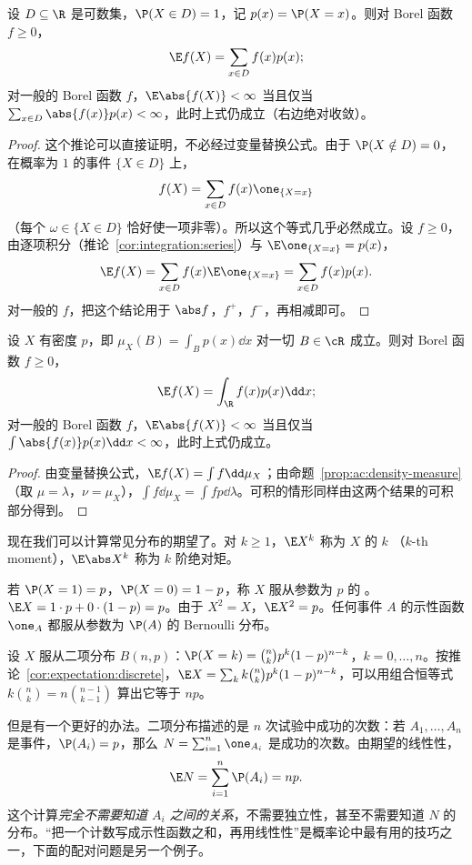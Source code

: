 \begin{corollary}[离散型随机变量]\label{cor:expectation:discrete}
设 $D\subseteq\R$ 是可数集，$\P(X\in D)=1$，记 $p(x)=\P(X=x)$。则对 Borel 函数 $f\geqslant0$，
\[
\E f(X)=\sum_{x\in D}f(x)p(x);
\]
对一般的 Borel 函数 $f$，$\E\abs{f(X)}<\infty$ 当且仅当 $\sum_{x\in D}\abs{f(x)}p(x)<\infty$，此时上式仍成立（右边绝对收敛）。
\end{corollary}
\begin{proof}
这个推论可以直接证明，不必经过变量替换公式。由于 $\P(X\notin D)=0$，在概率为 $1$ 的事件 $\{X\in D\}$ 上，
\[
f(X)=\sum_{x\in D}f(x)\one_{\{X=x\}}
\]
（每个 $\omega\in\{X\in D\}$ 恰好使一项非零）。所以这个等式几乎必然成立。设 $f\geqslant0$，由逐项积分（推论~\ref{cor:integration:series}）与 $\E\one_{\{X=x\}}=p(x)$，
\[
\E f(X)=\sum_{x\in D}f(x)\E\one_{\{X=x\}}=\sum_{x\in D}f(x)p(x).
\]
对一般的 $f$，把这个结论用于 $\abs f$，$f^+$，$f^-$，再相减即可。
\end{proof}

\begin{corollary}[有密度的随机变量]\label{cor:expectation:density}
设 $X$ 有密度 $p$，即 $\mu_X(B)=\int_Bp(x)\dd x$ 对一切 $B\in\cR$ 成立。则对 Borel 函数 $f\geqslant0$，
\[
\E f(X)=\int_\R f(x)p(x)\dd x;
\]
对一般的 Borel 函数 $f$，$\E\abs{f(X)}<\infty$ 当且仅当 $\int\abs{f(x)}p(x)\dd x<\infty$，此时上式仍成立。
\end{corollary}
\begin{proof}
由变量替换公式，$\E f(X)=\int f\dd\mu_X$；由命题~\ref{prop:ac:density-measure}（取 $\mu=\lambda$，$\nu=\mu_X$），$\int f\dd\mu_X=\int fp\dd\lambda$。可积的情形同样由这两个结果的可积部分得到。
\end{proof}

现在我们可以计算常见分布的期望了。对 $k\geqslant1$，$\E X^k$ 称为 $X$ 的 $k$ （$k$-th moment），$\E\abs X^k$ 称为 $k$ 阶绝对矩。

\begin{example}\label{ex:expectation:bernoulli}
若 $\P(X=1)=p$，$\P(X=0)=1-p$，称 $X$ 服从参数为 $p$ 的 。$\E X=1\cdot p+0\cdot(1-p)=p$。由于 $X^2=X$，$\E X^2=p$。任何事件 $A$ 的示性函数 $\one_A$ 都服从参数为 $\P(A)$ 的 Bernoulli 分布。
\end{example}

\begin{example}\label{ex:expectation:binomial}
设 $X$ 服从二项分布 $B(n,p)$：$\P(X=k)=\binom nkp^k(1-p)^{n-k}$，$k=0,\dots,n$。按推论~\ref{cor:expectation:discrete}，$\E X=\sum_kk\binom nkp^k(1-p)^{n-k}$，可以用组合恒等式 $k\binom nk=n\binom{n-1}{k-1}$ 算出它等于 $np$。

但是有一个更好的办法。二项分布描述的是 $n$ 次试验中成功的次数：若 $A_1,\dots,A_n$ 是事件，$\P(A_i)=p$，那么 $N=\sum_{i=1}^n\one_{A_i}$ 是成功的次数。由期望的线性性，
\[
\E N=\sum_{i=1}^n\P(A_i)=np .
\]
这个计算\emph{完全不需要知道 $A_i$ 之间的关系}，不需要独立性，甚至不需要知道 $N$ 的分布。“把一个计数写成示性函数之和，再用线性性”是概率论中最有用的技巧之一，下面的配对问题是另一个例子。
\end{example}

